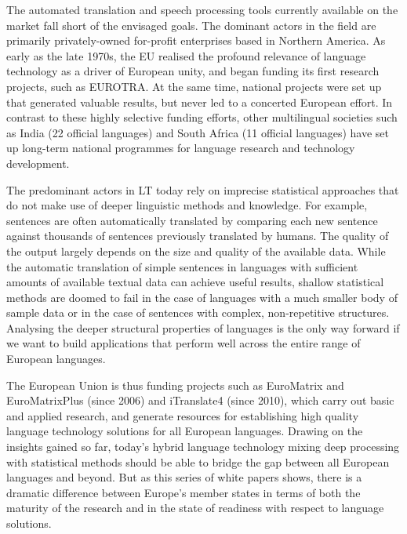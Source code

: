\begin{multicols}{2}

The automated translation and speech processing tools currently available on the market fall short of the envisaged goals. The dominant actors in the field are primarily privately-owned for-profit enterprises based in Northern America. As early as the late 1970s, the EU realised the profound relevance of language technology as a driver of European unity, and began funding its first research projects, such as EUROTRA. At the same time, national projects were set up that generated valuable results, but never led to a concerted European effort. In contrast to these highly selective funding efforts, other multilingual societies such as India (22 official languages) and South Africa (11 official languages) have set up long-term national programmes for language research and technology development. 

The predominant actors in LT today rely on imprecise statistical approaches that do not make use of deeper linguistic methods and knowledge. For example, sentences are often automatically translated by comparing each new sentence against thousands of sentences previously translated by humans. The quality of the output largely depends on the size and quality of the available  data. While the automatic translation of simple sentences in languages with sufficient amounts of available textual data can achieve useful results, shallow statistical methods are doomed to fail in the case of languages with a much smaller body of sample data or in the case of sentences with complex, non-repetitive structures. Analysing the deeper structural properties of languages is the only way forward if we want to build applications that perform well across the entire range of European languages.


The European Union is thus funding projects such as EuroMatrix and EuroMatrixPlus (since 2006) and iTranslate4 (since 2010), which carry out basic and applied research, and generate resources for establishing high quality language technology solutions for all European languages. Drawing on the insights gained so far, today’s hybrid language technology mixing deep processing with statistical methods should be able to bridge the gap between all European languages and beyond. But as this series of white papers shows, there is a dramatic difference between Europe’s member states in terms of both the maturity of the research and in the state of readiness with respect to language solutions. 


\end{multicols}
